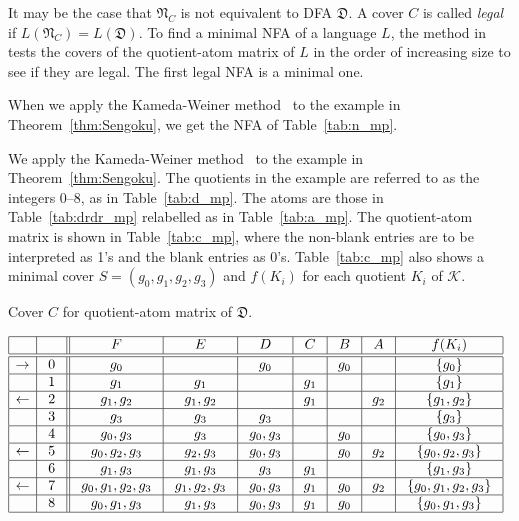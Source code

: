 \documentclass{llncs}
\newcommand{\cK}{{\mathcal K}}
\newcommand{\fD}{{\mathfrak D}}
\newcommand{\fN}{{\mathfrak N}}
\begin{document}
It may be the case that $\fN_C$ is not equivalent to DFA $\fD$.
A cover $C$ is called \emph{legal} if $L(\fN_C)=L(\fD)$.
To find a minimal NFA of a language $L$,
the method in~\cite{KaWe70} 
tests the covers of the quotient-atom matrix of $L$ in the order of 
increasing size to see if they are legal. 
The first legal NFA is a minimal one.

When we apply the Kameda-Weiner method~\cite{KaWe70} to the  example in 
Theorem~\ref{thm:Sengoku}, we get the NFA of Table~\ref{tab:n_mp}.


We apply the Kameda-Weiner method~\cite{KaWe70} to the  example in Theorem~\ref{thm:Sengoku}.
The quotients in the example are referred to as the integers 0--8, as in Table~\ref{tab:d_mp}.
The atoms are those in Table~\ref{tab:drdr_mp} relabelled as in Table~\ref{tab:a_mp}. 
The quotient-atom matrix is shown in Table~\ref{tab:c_mp}, where the non-blank entries are to be interpreted as 1's and the blank entries as 0's. 
Table~\ref{tab:c_mp} also shows a minimal cover $S=(g_0,g_1,g_2,g_3)$ and $f(K_i)$ for each quotient $K_i$ of $\cK$.



\begin{table}[hbt]
\caption{Cover $C$ for quotient-atom matrix of $\fD$.}
\label{tab:c_mp}
\begin{center}
$
\begin{array}{|c|c|| c| c| c| c| c| c| c|}    
\hline
& & \  F  \
& \ E \  & \ D \ & \ C \ & \ B \ & \  A  \ & \  f(K_i)  \ \\
\hline
\hline
\rightarrow &\ 0 \ & g_0 &   & g_0 &  & g_0 &  & \{g_0\} \\
\hline  
&\ 1 \ & g_1  & g_1 &  & g_1 &  &  & \{g_1\} \\
\hline  
\leftarrow &\ 2 \ & g_1,g_2  & g_1,g_2 &  & g_1 &  & g_2 & \{g_1,g_2\} \\
\hline  
&\ 3 \ & g_3 & g_3 & g_3 &  &  &  & \{g_3\} \\
\hline  
&\ 4 \ & g_0,g_3  & g_3 & g_0,g_3 &  & g_0 &  & \{g_0,g_3\} \\
\hline  
\leftarrow &\ 5 \ & g_0,g_2,g_3  & g_2,g_3 & g_0,g_3 &  & g_0 & g_2 & \{g_0,g_2,g_3\} \\
\hline  
&\ 6 \ & g_1,g_3  & g_1,g_3 & g_3 & g_1 &  &  & \{g_1,g_3\} \\
\hline  
\leftarrow &\ 7 \ & \ g_0,g_1,g_2,g_3 \ & \ g_1,g_2,g_3 \ &\  g_0,g_3 \ & g_1 & g_0 & g_2 & \
\{g_0,g_1,g_2,g_3\} \ \\
\hline  
& \ 8 \ & g_0,g_1,g_3  & g_1,g_3 & g_0,g_3 & g_1 & g_0 &  & \{g_0,g_1,g_3\} \\
\hline  
\end{array}
$
\end{center}
\end{table}
\end{document}
